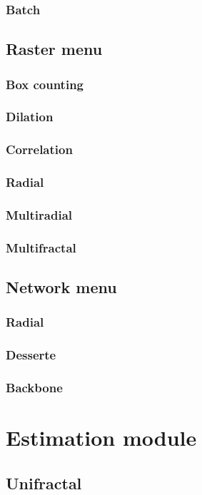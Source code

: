\documentclass[a4paper,10pt]{report}
\begin{document}
\subsection{Batch}

\section{Raster menu}
\subsection{Box counting}
\subsection{Dilation}
\subsection{Correlation}
\subsection{Radial}
\subsection{Multiradial}
\subsection{Multifractal}

\section{Network menu}
\subsection{Radial}
\subsection{Desserte}
\subsection{Backbone}

\chapter{Estimation module}
\section{Unifractal}
\end{document}
